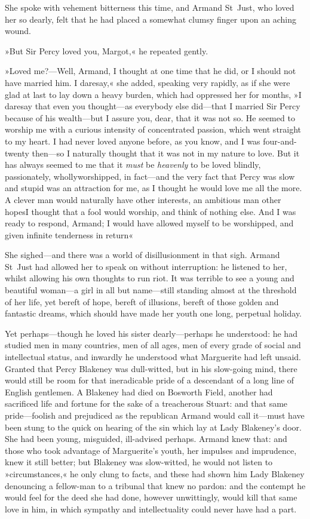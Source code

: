 She spoke with vehement bitterness this time, and Armand St~Just, who loved her so dearly, felt that he had placed a somewhat clumsy finger upon an aching wound.

»But Sir Percy loved you, Margot,« he repeated gently.

»Loved me?—Well, Armand, I thought at one time that he did, or I should not have married him. I daresay,« she added, speaking very rapidly, as if she were glad at last to lay down a heavy burden, which had oppressed her for months, »I daresay that even you thought—as everybody else did—that I married Sir Percy because of his wealth—but I assure you, dear, that it was not so. He seemed to worship me with a curious intensity of concentrated passion, which went straight to my heart. I had never loved anyone before, as you know, and I was four-and-twenty then—so I naturally thought that it was not in my nature to love. But it has always seemed to me that it \textit{must} be \textit{heavenly} to be loved blindly, passionately, wholly\textellipsis \allowbreak  worshipped, in fact—and the very fact that Percy was slow and stupid was an attraction for me, as I thought he would love me all the more. A clever man would naturally have other interests, an ambitious man other hopes\textellipsis \allowbreak  I thought that a fool would worship, and think of nothing else. And I was ready to respond, Armand; I would have allowed myself to be worshipped, and given infinite tenderness in return\textellipsis«

She sighed—and there was a world of disillusionment in that sigh. Armand St~Just had allowed her to speak on without interruption: he listened to her, whilst allowing his own thoughts to run riot. It was terrible to see a young and beautiful woman—a girl in all but name—still standing almost at the threshold of her life, yet bereft of hope, bereft of illusions, bereft of those golden and fantastic dreams, which should have made her youth one long, perpetual holiday.

Yet perhaps—though he loved his sister dearly—perhaps he understood: he had studied men in many countries, men of all ages, men of every grade of social and intellectual status, and inwardly he understood what Marguerite had left unsaid. Granted that Percy Blakeney was dull-witted, but in his slow-going mind, there would still be room for that ineradicable pride of a descendant of a long line of English gentlemen. A Blakeney had died on Bosworth Field, another had sacrificed life and fortune for the sake of a treacherous Stuart: and that same pride—foolish and prejudiced as the republican Armand would call it—must have been stung to the quick on hearing of the sin which lay at Lady Blakeney's door. She had been young, misguided, ill-advised perhaps. Armand knew that: and those who took advantage of Marguerite's youth, her impulses and imprudence, knew it still better; but Blakeney was slow-witted, he would not listen to »circumstances,« he only clung to facts, and these had shown him Lady Blakeney denouncing a fellow-man to a tribunal that knew no pardon: and the contempt he would feel for the deed she had done, however unwittingly, would kill that same love in him, in which sympathy and intellectuality could never have had a part.


